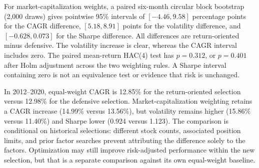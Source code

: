 For market-capitalization weights, a paired six-month circular block bootstrap (2,000 draws) gives pointwise 95\% intervals of $[-4.46,9.58]$ percentage points for the CAGR difference, $[5.18,8.91]$ points for the volatility difference, and $[-0.628,0.073]$ for the Sharpe difference. All differences are return-oriented minus defensive. The volatility increase is clear, whereas the CAGR interval includes zero. The paired mean-return HAC(4) test has $p=0.312$, or $p=0.401$ after Holm adjustment across the two weighting rules. A Sharpe interval containing zero is not an equivalence test or evidence that risk is unchanged.

In 2012--2020, equal-weight CAGR is 12.85\% for the return-oriented selection versus 12.98\% for the defensive selection. Market-capitalization weighting retains a CAGR increase (14.99\% versus 13.56\%), but volatility remains higher (15.86\% versus 11.40\%) and Sharpe lower (0.924 versus 1.123). The comparison is conditional on historical selections: different stock counts, associated position limits, and prior factor searches prevent attributing the difference solely to the factors. Optimization may still improve risk-adjusted performance within the new selection, but that is a separate comparison against its own equal-weight baseline.

